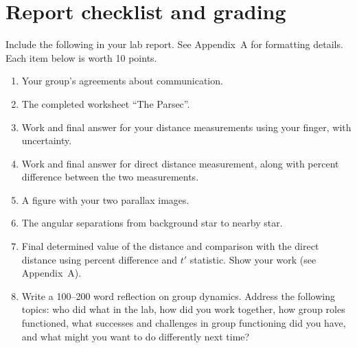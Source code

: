 \section{Report checklist and grading}

Include the following in your lab report. See Appendix~A for formatting details. Each item below is worth 10 points. %

\begin{enumerate}
	\item Your group's agreements about communication.
	\item The completed worksheet ``The Parsec''.
	\item Work and final answer for your distance measurements using your finger, with uncertainty.
	\item Work and final answer for direct distance measurement, along with percent difference between the two measurements.
	\item A figure with your two parallax images.
	\item The angular separations from background star to nearby star.
	\item Final determined value of the distance and comparison with the direct distance using percent difference and $t'$ statistic. Show your work (see Appendix~A). %
	\item Write a 100--200 word reflection on group dynamics. Address the following topics: who did what in the lab, how did you work together, how group roles functioned, what successes and challenges in group functioning did you have, and what might you want to do differently next time?
\end{enumerate}
